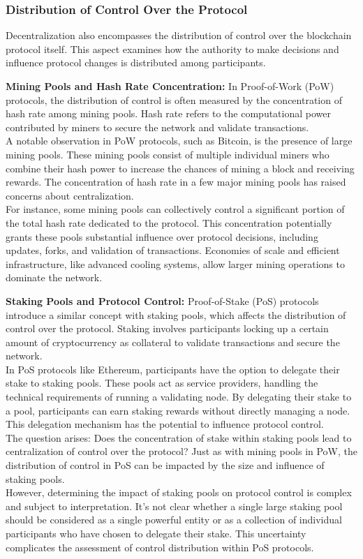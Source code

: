 \subsubsection{Distribution of Control Over the Protocol}
Decentralization also encompasses the distribution of control over the blockchain protocol itself. This aspect examines how the authority to make decisions and influence protocol changes is distributed among participants.

\noindent
\textbf{Mining Pools and Hash Rate Concentration:} In Proof-of-Work (PoW) protocols, the distribution of control is often measured by the concentration of hash rate among mining pools. Hash rate refers to the computational power contributed by miners to secure the network and validate transactions.\\
A notable observation in PoW protocols, such as Bitcoin, is the presence of large mining pools. These mining pools consist of multiple individual miners who combine their hash power to increase the chances of mining a block and receiving rewards. The concentration of hash rate in a few major mining pools has raised concerns about centralization.\\
For instance, some mining pools can collectively control a significant portion of the total hash rate dedicated to the protocol. This concentration potentially grants these pools substantial influence over protocol decisions, including updates, forks, and validation of transactions. Economies of scale and efficient infrastructure, like advanced cooling systems, allow larger mining operations to dominate the network.

\noindent
\textbf{Staking Pools and Protocol Control:} Proof-of-Stake (PoS) protocols introduce a similar concept with staking pools, which affects the distribution of control over the protocol. Staking involves participants locking up a certain amount of cryptocurrency as collateral to validate transactions and secure the network.\\
In PoS protocols like Ethereum, participants have the option to delegate their stake to staking pools. These pools act as service providers, handling the technical requirements of running a validating node. By delegating their stake to a pool, participants can earn staking rewards without directly managing a node. This delegation mechanism has the potential to influence protocol control.\\
The question arises: Does the concentration of stake within staking pools lead to centralization of control over the protocol? Just as with mining pools in PoW, the distribution of control in PoS can be impacted by the size and influence of staking pools.\\
However, determining the impact of staking pools on protocol control is complex and subject to interpretation. It's not clear whether a single large staking pool should be considered as a single powerful entity or as a collection of individual participants who have chosen to delegate their stake. This uncertainty complicates the assessment of control distribution within PoS protocols.

